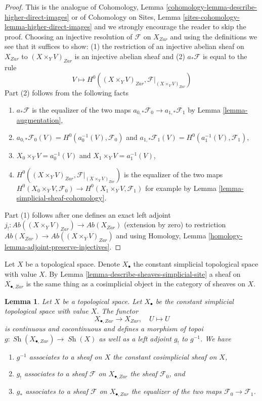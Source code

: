\documentclass{stacks-project}
\theoremstyle{plain}
\newtheorem{lemma}[subsection]{Lemma}
\theoremstyle{definition}
\theoremstyle{remark}
\numberwithin{equation}{subsection}
\def\Sh{\mathop{\mathit{Sh}}\nolimits}
\begin{document}
\begin{proof}
This is the analogue of
Cohomology, Lemma \ref{cohomology-lemma-describe-higher-direct-images} or of
Cohomology on Sites, Lemma \ref{sites-cohomology-lemma-higher-direct-images}
and we strongly encourage the reader to skip the proof.
Choosing an injective resolution of $\mathcal{F}$ on
$X_{Zar}$ and using the definitions we see that it suffices to show:
(1) the restriction of an injective abelian
sheaf on $X_{Zar}$ to $(X \times_Y V)_{Zar}$ is an injective abelian sheaf and
(2) $a_*\mathcal{F}$ is equal to the rule
$$
V \longmapsto H^0((X \times_Y V)_{Zar}, \mathcal{F}|_{(X \times_Y V)_{Zar}})
$$
Part (2) follows from the following facts
\begin{enumerate}
\item[(2a)] $a_*\mathcal{F}$ is the equalizer of the two maps
$a_{0, *}\mathcal{F}_0 \to a_{1, *}\mathcal{F}_1$
by Lemma \ref{lemma-augmentation},
\item[(2b)] $a_{0, *}\mathcal{F}_0(V) =
H^0(a_0^{-1}(V), \mathcal{F}_0)$ and
$a_{1, *}\mathcal{F}_1(V) = H^0(a_1^{-1}(V), \mathcal{F}_1)$,
\item[(2c)] $X_0 \times_Y V = a_0^{-1}(V)$ and $X_1 \times_Y V = a_1^{-1}(V)$,
\item[(2d)] $H^0((X \times_Y V)_{Zar}, \mathcal{F}|_{(X \times_Y V)_{Zar}})$
is the equalizer of the two maps
$H^0(X_0 \times_Y V, \mathcal{F}_0) \to H^0(X_1 \times_Y V, \mathcal{F}_1)$
for example by Lemma \ref{lemma-simplicial-sheaf-cohomology}.
\end{enumerate}
Part (1) follows after one defines an exact left adjoint
$j_! : \textit{Ab}((X \times_Y V)_{Zar}) \to \textit{Ab}(X_{Zar})$
(extension by zero) to restriction
$\textit{Ab}(X_{Zar}) \to \textit{Ab}((X \times_Y V)_{Zar})$
and using Homology, Lemma \ref{homology-lemma-adjoint-preserve-injectives}.
\end{proof}

\noindent
Let $X$ be a topological space. Denote $X_\bullet$ the constant simplicial
topological space with value $X$. By
Lemma \ref{lemma-describe-sheaves-simplicial-site}
a sheaf on $X_{\bullet, Zar}$ is the same
thing as a cosimplicial object in the category of sheaves on $X$.

\begin{lemma}
\label{lemma-constant-simplicial-space}
Let $X$ be a topological space. Let $X_\bullet$ be the constant
simplicial topological space with value $X$. The functor
$$
X_{\bullet, Zar} \longrightarrow X_{Zar},\quad
U \longmapsto U
$$
is continuous and cocontinuous and defines a morphism of
topoi $g : \Sh(X_{\bullet, Zar}) \to \Sh(X)$ as well as a left adjoint
$g_!$ to $g^{-1}$. We have
\begin{enumerate}
\item $g^{-1}$ associates to a sheaf on $X$ the constant cosimplicial
sheaf on $X$,
\item $g_!$ associates to a sheaf $\mathcal{F}$ on $X_{\bullet, Zar}$ the
sheaf $\mathcal{F}_0$, and
\item $g_*$ associates to a sheaf $\mathcal{F}$ on $X_{\bullet, Zar}$ the
equalizer of the two maps $\mathcal{F}_0 \to \mathcal{F}_1$.
\end{enumerate}
\end{lemma}
\end{document}
